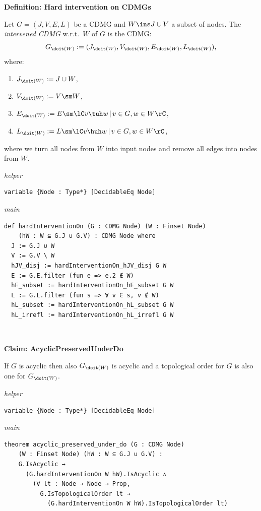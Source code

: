 \noindent\textbf{Definition: Hard intervention on CDMGs}\par\smallskip
{\appendixTexSize
\label{def:G_hard_intervention}
    Let $G=(J,V,E,L)$ be a CDMG and $W \ins J \cup V$ a subset of nodes.
  The \emph{intervened CDMG} w.r.t.\ $W$ of $G$ is the CDMG: 
  \[ G_{\doit(W)}:=(J_{\doit(W)},V_{\doit(W)},E_{\doit(W)},L_{\doit(W)}),\] 
  where:
  \begin{enumerate}[label=\roman*.)]
      \item $J_{\doit(W)}:= J \cup W$,
      \item $V_{\doit(W)}:= V \sm W$,
      \item $E_{\doit(W)}:= E \sm \lC v \tuh w \,|\, v \in G, w  \in W  \rC$,
      \item $L_{\doit(W)}:= L \sm \lC v \huh w\,|\, v \in G, w \in W \rC$,
  \end{enumerate}
  where we turn all nodes from $W$ into input nodes and remove all edges into nodes from $W$.
\par}
\smallskip
{\small\textit{helper}}
\begin{verbatim}
variable {Node : Type*} [DecidableEq Node]
\end{verbatim}
{\small\textit{main}}
\begin{verbatim}
def hardInterventionOn (G : CDMG Node) (W : Finset Node)
    (hW : W ⊆ G.J ∪ G.V) : CDMG Node where
  J := G.J ∪ W
  V := G.V \ W
  hJV_disj := hardInterventionOn_hJV_disj G W
  E := G.E.filter (fun e => e.2 ∉ W)
  hE_subset := hardInterventionOn_hE_subset G W
  L := G.L.filter (fun s => ∀ v ∈ s, v ∉ W)
  hL_subset := hardInterventionOn_hL_subset G W
  hL_irrefl := hardInterventionOn_hL_irrefl G W
\end{verbatim}
~%

\vspace{\appendixNotesGap}

\noindent\textbf{Claim: AcyclicPreservedUnderDo}\par\smallskip
{\appendixTexSize
    If $G$ is acyclic then also $G_{\doit(W)}$ is acyclic and a topological order for $G$ is also one for $G_{\doit(W)}$.
\par}
\smallskip
{\small\textit{helper}}
\begin{verbatim}
variable {Node : Type*} [DecidableEq Node]
\end{verbatim}
{\small\textit{main}}
\begin{verbatim}
theorem acyclic_preserved_under_do (G : CDMG Node)
    (W : Finset Node) (hW : W ⊆ G.J ∪ G.V) :
    G.IsAcyclic →
      (G.hardInterventionOn W hW).IsAcyclic ∧
        (∀ lt : Node → Node → Prop,
          G.IsTopologicalOrder lt →
            (G.hardInterventionOn W hW).IsTopologicalOrder lt)
\end{verbatim}
~%

